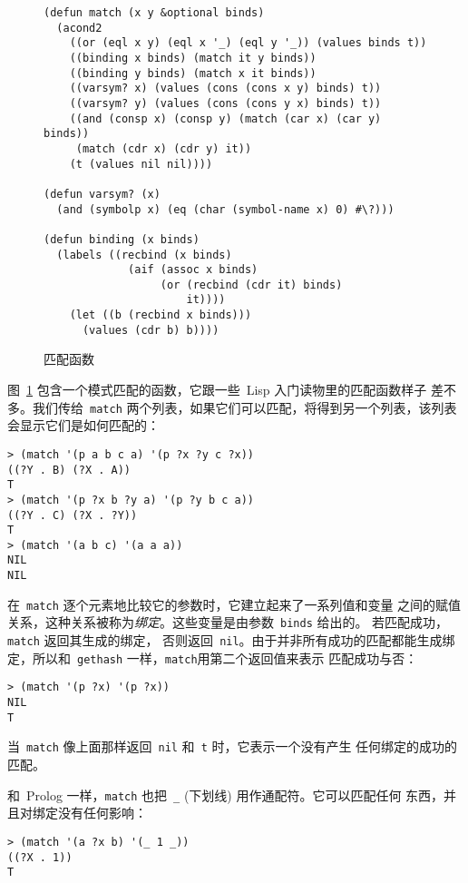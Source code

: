 \begin{figure}
\begin{lstlisting}
(defun match (x y &optional binds)
  (acond2
    ((or (eql x y) (eql x '_) (eql y '_)) (values binds t))
    ((binding x binds) (match it y binds))
    ((binding y binds) (match x it binds))
    ((varsym? x) (values (cons (cons x y) binds) t))
    ((varsym? y) (values (cons (cons y x) binds) t))
    ((and (consp x) (consp y) (match (car x) (car y) binds))
     (match (cdr x) (cdr y) it))
    (t (values nil nil))))

(defun varsym? (x)
  (and (symbolp x) (eq (char (symbol-name x) 0) #\?)))

(defun binding (x binds)
  (labels ((recbind (x binds)
             (aif (assoc x binds)
                  (or (recbind (cdr it) binds)
                      it))))
    (let ((b (recbind x binds)))
      (values (cdr b) b))))
\end{lstlisting}
  \caption{匹配函数}
  \label{fig:matching_function}
\end{figure}

图~\ref{fig:matching_function} 包含一个模式匹配的函数，它跟一些~Lisp 入门读物里的匹配函数样子
差不多。我们传给~\texttt{match} 两个列表，如果它们可以匹配，将得到另一个列表，该列表
会显示它们是如何匹配的：
\begin{lstlisting}
> (match '(p a b c a) '(p ?x ?y c ?x))
((?Y . B) (?X . A))
T
> (match '(p ?x b ?y a) '(p ?y b c a))
((?Y . C) (?X . ?Y))
T
> (match '(a b c) '(a a a))
NIL
NIL
\end{lstlisting}

在~\texttt{match} 逐个元素地比较它的参数时，它建立起来了一系列值和变量
之间的赋值关系，这种关系被称为\emph{绑定}。这些变量是由参数~\texttt{binds} 给出的。
若匹配成功，\texttt{match} 返回其生成的绑定，
否则返回~\texttt{nil}。由于并非所有成功的匹配都能生成绑
定，所以和~\texttt{gethash} 一样，\texttt{match}用第二个返回值来表示
匹配成功与否：
\begin{lstlisting}
> (match '(p ?x) '(p ?x))
NIL
T
\end{lstlisting}
当~\texttt{match} 像上面那样返回~\texttt{nil} 和~\texttt{t} 时，它表示一个没有产生
任何绑定的成功的匹配。

和~Prolog 一样，\texttt{match} 也把~\texttt{\_} (下划线) 用作通配符。它可以匹配任何
东西，并且对绑定没有任何影响：
\begin{lstlisting}
> (match '(a ?x b) '(_ 1 _))
((?X . 1))
T
\end{lstlisting}

